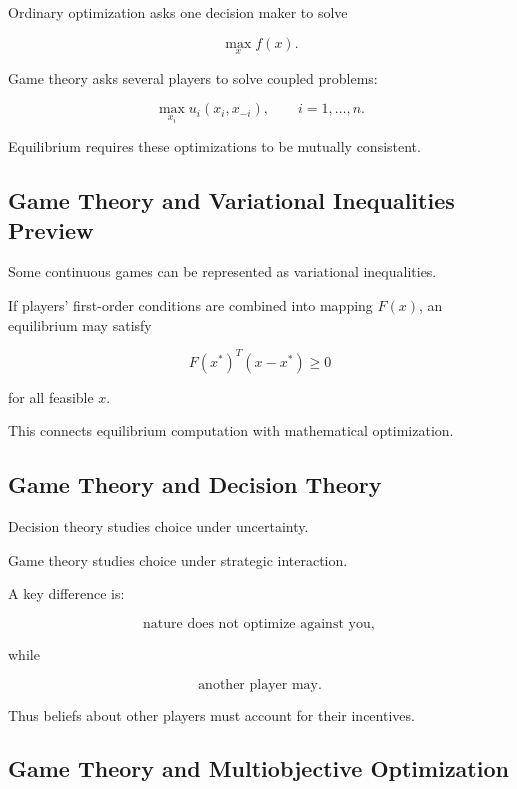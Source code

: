 Ordinary optimization asks one decision maker to solve

\[
\boxed{
\max_x
f(x).
}
\]

Game theory asks several players to solve coupled problems:

\[
\boxed{
\max_{x_i}
u_i(x_i,x_{-i}),
\qquad
i=1,\ldots,n.
}
\]

Equilibrium requires these optimizations to be mutually consistent.

\subsection{Game Theory and Variational Inequalities Preview}
\label{subsec:game-theory-variational-inequalities}

Some continuous games can be represented as variational inequalities.

If players' first-order conditions are combined into mapping \(F(x)\), an
equilibrium may satisfy

\[
\boxed{
F(x^*)^T
(x-x^*)
\geq
0
}
\]

for all feasible \(x\).

This connects equilibrium computation with mathematical optimization.

\subsection{Game Theory and Decision Theory}
\label{subsec:game-theory-decision-connection}

Decision theory studies choice under uncertainty.

Game theory studies choice under strategic interaction.

A key difference is:

\[
\boxed{
\text{nature does not optimize against you},
}
\]

while

\[
\boxed{
\text{another player may}.
}
\]

Thus beliefs about other players must account for their incentives.

\subsection{Game Theory and Multiobjective Optimization}
\label{subsec:game-theory-multiobjective}

